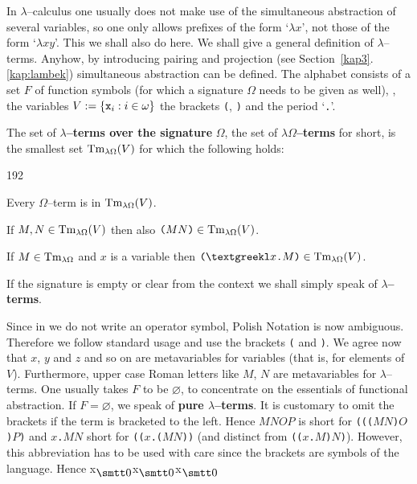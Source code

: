 In $\lambda$--calculus one usually does not make use of the
simultaneous abstraction of several variables, so one only allows
prefixes of the form `$\lambda x$', not those of the form
`$\lambda xy$'. This we shall also do here. We shall give a
general definition of $\lambda$--terms. Anyhow, by introducing
pairing and projection (see Section~\ref{kap3}.\ref{kap:lambek}) simultaneous 
abstraction can be defined. The alphabet consists of a set 
$F$ of function symbols (for which a signature $\Omega$ needs 
to be given as well), {\tt\stlambda}, the variables 
$V := \{\mbox{\tt x}_i : i \in \omega\}$ the brackets 
{\tt (}, {\tt )} and the period `{\tt .}'.
\begin{defn}
The set of \textbf{$\lambda$--terms over the signature} $\Omega$,
the set of \textbf{$\lambda\Omega$--terms} for short, is the
smallest set $\operatorname{Tm}_{\lambda\Omega}(V)$ for which the
following holds:
\begin{dingautolist}{192}
\item Every $\Omega$--term is in $\operatorname{Tm}_{\lambda\Omega}(V)$.
\item If $M, N \in \operatorname{Tm}_{\lambda\Omega}(V)$ then also
    $\mbox{\tt ($MN$)} \in \operatorname{Tm}_{\lambda\Omega}(V)$.
\item If $M \in \operatorname{Tm}_{\lambda\Omega}$ and $x$ is a
    variable then $\mbox{\tt (\stlambda$x$.$M$)}
    \in \Tm_{\lambda\Omega}(V)$.
\end{dingautolist}
If the signature is empty or clear from the context we shall
simply speak of \textbf{$\lambda$--terms}.
\end{defn}
Since in  we do not write an operator symbol, Polish Notation 
is now ambiguous. Therefore we follow standard usage and use the brackets 
{\tt (} and {\tt )}. We agree now that $x$, $y$ and $z$ and so on 
are metavariables for variables (that is, for elements of $V$). 
Furthermore, upper case Roman letters like $M$, $N$ are metavariables 
for $\lambda$--terms. One usually takes $F$ to be $\varnothing$, to
concentrate on the essentials of functional abstraction.
If $F = \varnothing$, we speak of \textbf{pure $\lambda$--terms}.
It is customary to omit the brackets if the term is bracketed
to the left. Hence $MNOP$ is short for {\tt ((($MN$)$O$)$P$)} 
and {\tt \stlambda$x$.$MN$} short for {\tt ((\stlambda$x$.($MN$))}
(and distinct from {\tt ((\stlambda$x$.$M$)$N$)}). However, this 
abbreviation has to be used with care since the brackets are symbols 
of the language. Hence {\mtt x$_{\snull}$x$_{\snull}$x$_{\snull}$} 
